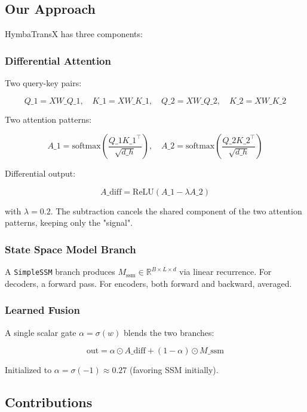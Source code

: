 \subsection{Our Approach}

HymbaTransX has three components:

\subsubsection{Differential Attention}

Two query-key pairs:

\[
Q\_1 = X W\_{Q\_1}, \quad K\_1 = X W\_{K\_1}, \quad
Q\_2 = X W\_{Q\_2}, \quad K\_2 = X W\_{K\_2}
\tag{1.1}
\]

Two attention patterns:

\[
A\_1 = \text{softmax}\!\left(\frac{Q\_1 K\_1^\top}{\sqrt{d\_h}}\right), \quad
A\_2 = \text{softmax}\!\left(\frac{Q\_2 K\_2^\top}{\sqrt{d\_h}}\right)
\tag{1.2}
\]

Differential output:

\[
A\_\text{diff} = \text{ReLU}(A\_1 - \lambda A\_2)
\tag{1.3}
\]

with $\lambda = 0.2$. The subtraction cancels the shared component of the 
two attention patterns, keeping only the "signal".

\subsubsection{State Space Model Branch}

A \texttt{SimpleSSM} branch produces $M_\text{ssm} \in \mathbb{R}^{B \times L \times d}$ 
via linear recurrence. For decoders, a forward pass. For encoders, both 
forward and backward, averaged.

\subsubsection{Learned Fusion}

A single scalar gate $\alpha = \sigma(w)$ blends the two branches:

\[
\text{out} = \alpha \odot A\_\text{diff} + (1 - \alpha) \odot M\_\text{ssm}
\tag{1.4}
\]

Initialized to $\alpha = \sigma(-1) \approx 0.27$ (favoring SSM initially).

\subsection{Contributions}

